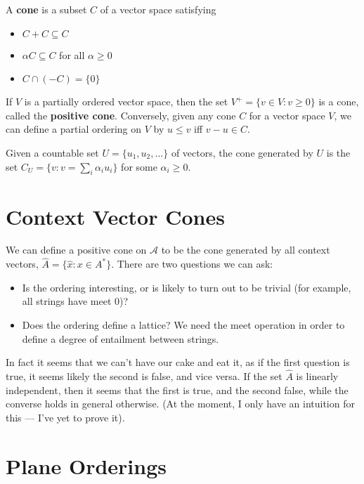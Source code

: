 \documentclass{article}
\begin{document}
\begin{center}

\end{center}

A \textbf{cone} is a subset $C$ of a vector space satisfying
\begin{itemize}
\item $C + C \subseteq C$
\item $\alpha C \subseteq C$ for all $\alpha \ge 0$
\item $C \cap (-C) = \{0\}$
\end{itemize}
If $V$ is a partially ordered vector space, then the set $V^+ = \{v
\in V : v \ge 0\}$ is a cone, called the \textbf{positive
  cone}. Conversely, given any cone $C$ for a vector space $V$, we can
define a partial ordering on $V$ by $u \le v$ iff $v - u \in C$.

Given a countable set $U = \{u_1, u_2, \ldots\}$ of vectors, the cone
generated by $U$ is the set $C_U = \{v : v = \sum_i \alpha_i u_i\}$ for
some $\alpha_i \ge 0$.

\section{Context Vector Cones}

We can define a positive cone on $\mathcal{A}$ to be the cone
generated by all context vectors, $\hat{A} = \{\hat{x} : x \in A^*\}$. There are
two questions we can ask:
\begin{itemize}
\item Is the ordering interesting, or is likely to turn out to be
  trivial (for example, all strings have meet $0$)?
\item Does the ordering define a lattice? We need the meet operation
in order to define a degree of entailment between strings.
\end{itemize}

In fact it seems that we can't have our cake and eat it, as if the
first question is true, it seems likely the second is false, and vice
versa. If the set $\hat{A}$ is linearly independent, then it seems
that the first is true, and the second false, while the converse holds
in general otherwise. (At the moment, I only have an intuition for
this --- I've yet to prove it).


\section{Plane Orderings}




\end{document}
